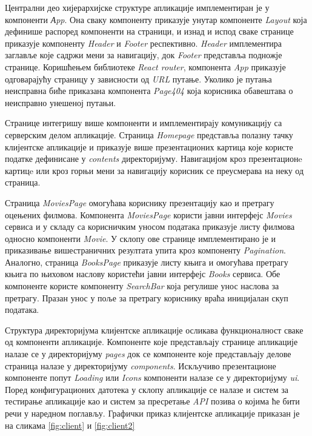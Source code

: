 \documentclass[12pt,oneside]{memoir}
\begin{document}
Централни део хијерархијске структуре апликације имплементиран је у компоненти \textit{Аpp}. Она сваку компоненту приказује унутар компоненте \textit{Layout} која дефинише распоред компоненти на страници, и изнад и испод сваке странице приказује компоненту \textit{Header} и \textit{Footer} респективно. \textit{Header} имплементира заглавље које садржи мени за навигацију, док \textit{Footer} представља подножје странице. Коришћењем библиотеке \textit{React router}, компонента \textit{App} приказује одговарајућу страницу у зависности од \textit{URL} путање. Уколико је путања неисправна биће приказана компонента \textit{Page404} која корисника обавештава о неисправно унешеној путањи.  

Странице интегришу више компоненти и имплементирају комуникацију са серверским делом апликације. Страница \textit{Homepage} представља полазну тачку клијентске апликације и приказује више презентационих картица које користе податке дефинисане у \textit{contents} директоријуму. Навигацијом кроз презентационe картицe или кроз горњи мени за навигацију корисник се преусмерава на неку од страница. 

Страница \textit{MoviesPage} омогућава кориснику презентацију као и претрагу оцењених филмова. Компонента  \textit{MoviesPage} користи јавни интерфејс \textit{Movies} сервиса и у складу са корисничким уносом података приказује листу филмова односно компоненти \textit{Movie}.  У склопу ове странице имплементирано је и приказивање вишестраничних резултата упита кроз компоненту \textit{Pagination}. Аналогно, страница \textit{BooksPage} приказује листу књига и омогућава претрагу књига по њиховом наслову користећи јавни интерфејс \textit{Books} сервиса. Обе компоненте користе компоненту \textit{SearchBar} која регулише унос наслова за претрагу. Празан унос у поље за претрагу кориснику враћа иницијалан скуп података.

Структура директоријума клијентске апликације осликава функционалност сваке од компоненти апликације. Компоненте које представљају странице апликације налазе се у директоријуму \textit{pages} док се компоненте које представљају делове страница налазе у директоријуму \textit{components}. Искључиво презентационе компоненте попут \textit{Loading} или \textit{Icons} компоненти налазе се у директоријуму \textit{ui}. Поред конфигурационих датотека у склопу апликације се налазе и систем за тестирање апликације као и систем за пресретање \textit{API} позива о којима ће бити речи у наредном поглављу. Графички приказ клијентске апликације приказан је на сликама \ref{fig:client} и \ref{fig:client2} 
\end{document}
